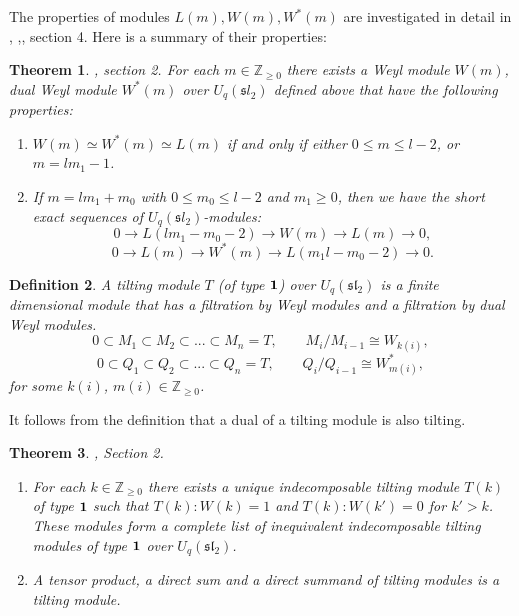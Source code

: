 \documentclass[11pt]{amsart}
\newcommand\lie[1]{\mathfrak{#1}}
\newcommand{\Z}{\mathbb{Z}}
\newtheorem{theorem}{Theorem}[section]
\newtheorem{definition}[theorem]{Definition}
\begin{document}
The properties of modules $L(m), W(m), W^*(m)$ are investigated in detail in \cite{Lus89}, \cite{AT} ,\cite{APW1}, section 4. 
Here is a summary of their properties: 
\begin{theorem} \cite{AT}, section 2.  \label{Weyl} 
For each $m \in \mathbb{Z}_{\geq 0}$ there exists a Weyl module $W(m)$, dual Weyl module $W^*(m)$ over $U_q({\lie sl}_2)$ defined above 
that have the following properties: 
\begin{enumerate} 
\item $W(m) \simeq W^*(m) \simeq L(m)$ if and only if either $0 \leq m \leq l-2$, or $m = lm_1 -1$.  
\item If $m = lm_1 + m_0$ with $0 \leq m_0 \leq l-2$ and $m_1 \geq 0$, then we have the short exact sequences of $U_q({\lie sl}_2)$-modules: 
\[ 0 \longrightarrow L(lm_1 - m_0 -2) \longrightarrow W(m)  \longrightarrow L(m) \longrightarrow 0 , \]
\[ 0 \longrightarrow L(m) \longrightarrow W^*(m) \longrightarrow L(m_1 l -m_0 -2) \longrightarrow 0 .\] 
\end{enumerate} 
\end{theorem} 

\begin{definition} A tilting module $T $ (of type ${\bf 1}$) over $U_q(\lie{sl}_2)$ is a finite dimensional module that has a filtration by Weyl modules and a filtration by dual Weyl modules. 
\[   0 \subset  M_1 \subset M_2 \subset ... \subset M_n = T , \quad \quad M_i / M_{i-1} \cong W_{k(i)}  ,  \] 
\[  0 \subset Q_1 \subset Q_2 \subset  ... \subset Q_n = T , \quad \quad Q_i / Q_{i-1} \cong W_{m(i)}^* , \]
for some $k(i)$, $m(i) \in \mathbb{Z}_{\geq 0}$. 
\end{definition} 


It follows from the definition that a dual of a tilting module is also tilting. 
\begin{theorem} \cite{AT}, Section 2. \label{tilt_prop1} 
\begin{enumerate} 
\item For each  $k \in \Z_{\geq 0}$ there exists a unique indecomposable tilting module $T(k)$ of type ${\bf 1}$ such that $T(k) : W(k)=  1$ and $T(k) : W(k') =0$ for $k' >k$. These modules form a complete list of inequivalent indecomposable tilting modules of type ${\bf 1}$  over  $U_q(\lie{sl}_2)$. 
\item  A tensor product, a direct sum and a direct summand of tilting modules is a tilting module. 
\end{enumerate} 
\end{theorem} 
 
\end{document}
